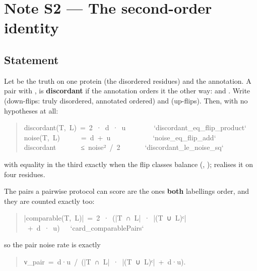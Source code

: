 \section*{Note S2 --- The second-order identity}


\subsection*{Statement}

Let  be the truth on one protein (the disordered residues) and 
the annotation. A pair  with ,  is \textbf{discordant} if the
annotation orders it the other way:  and . Write 
(down-flips: truly disordered, annotated ordered) and  (up-flips).
Then, with no hypotheses at all:

\begin{quote}\ttfamily\footnotesize\begin{flushleft}
discordant(T,~L)~=~2~·~d~·~u~~~~~~~~`discordant\_eq\_flip\_product`\\
noise(T,~L)~~~~~~=~d~+~u~~~~~~~~~~~~`noise\_eq\_flip\_add`\\
discordant~~~~~~~≤~noise²~/~2~~~~~~~`discordant\_le\_noise\_sq`\\
\end{flushleft}\end{quote}

with equality in the third exactly when the flip classes balance
(, );  realises it on four
residues.

The pairs a pairwise protocol can score are the ones \textbf{both} labellings order,
and they are counted exactly too:

\begin{quote}\ttfamily\footnotesize\begin{flushleft}
|comparable(T,~L)|~=~2~·~(|T~∩~L|~·~|(T~∪~L)ᶜ|~+~d~·~u)~~~`card\_comparablePairs`\\
\end{flushleft}\end{quote}

so the pair noise rate is exactly

\begin{quote}\ttfamily\footnotesize\begin{flushleft}
ν\_pair~=~d·u~/~(|T~∩~L|~·~|(T~∪~L)ᶜ|~+~d·u).\\
\end{flushleft}\end{quote}

